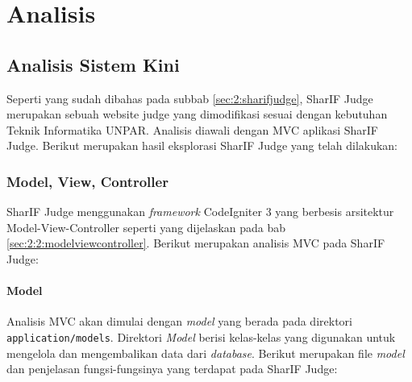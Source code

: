 \chapter{Analisis}
\label{chap:analisis}


\section{Analisis Sistem Kini}
\label{sec:3:sistemkini}

Seperti yang sudah dibahas pada subbab \ref{sec:2:sharifjudge}, SharIF Judge merupakan sebuah website judge yang dimodifikasi sesuai dengan kebutuhan Teknik Informatika UNPAR. Analisis diawali dengan MVC aplikasi SharIF Judge. Berikut merupakan hasil eksplorasi SharIF Judge yang telah dilakukan:

\subsection{Model, View, Controller}
\label{sec:3:1:modelviewcontroller}

SharIF Judge menggunakan \textit{framework} CodeIgniter 3 yang berbesis arsitektur Model-View-Controller seperti yang dijelaskan pada bab \ref{sec:2:2:modelviewcontroller}. Berikut merupakan analisis MVC pada SharIF Judge:

\subsubsection{Model}
\label{sec:3:1:1:model}

Analisis MVC akan dimulai dengan \textit{model} yang berada pada direktori \verb|application/models|. Direktori \textit{Model} berisi kelas-kelas yang digunakan untuk mengelola dan mengembalikan data dari \textit{database}. Berikut merupakan file \textit{model} dan penjelasan fungsi-fungsinya yang terdapat pada SharIF Judge:

